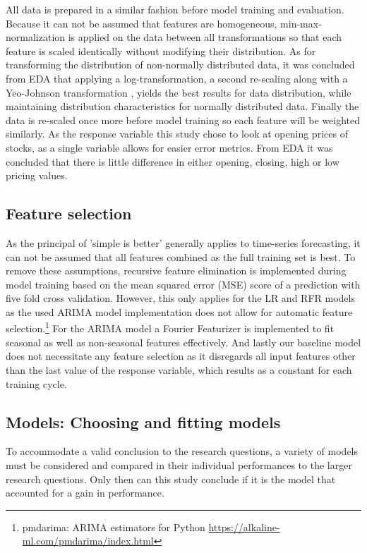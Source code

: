 All data is prepared in a similar fashion before model training and evaluation. Because it can not be assumed that features are homogeneous, min-max-normalization is applied on the data between all transformations so that each feature is scaled identically without modifying their distribution. As for transforming the distribution of non-normally distributed data, it was concluded from EDA that applying a log-transformation, a second re-scaling along with a Yeo-Johnson transformation \cite{yeo2000new}, yields the best results for data distribution, while maintaining distribution characteristics for normally distributed data. Finally the data is re-scaled once more before model training so each feature will be weighted similarly. As the response variable this study chose to look at opening prices of stocks, as a single variable allows for easier error metrics. From EDA it was concluded that there is little difference in either opening, closing, high or low pricing values.

\subsection{Feature selection}

As the principal of 'simple is better' generally applies to time-series forecasting, it can not be assumed that all features combined as the full training set is best. To remove these assumptions, recursive feature elimination is implemented during model training based on the mean squared error (MSE) score of a prediction with five fold cross validation. However, this only applies for the LR and RFR models as the used ARIMA model implementation does not allow for automatic feature selection.\footnote{pmdarima: ARIMA estimators for Python \url{https://alkaline-ml.com/pmdarima/index.html}} For the ARIMA model a Fourier Featurizer is implemented to fit seasonal as well as non-seasonal features effectively. And lastly our baseline model does not necessitate any feature selection as it disregards all input features other than the last value of the response variable, which results as a constant for each training cycle.

\subsection{Models: Choosing and fitting models}
\label{sec:models}

To accommodate a valid conclusion to the research questions, a variety of models must be considered  and compared in their individual performances to the larger research questions. Only then can this study conclude if it is the model that accounted for a gain in performance.

